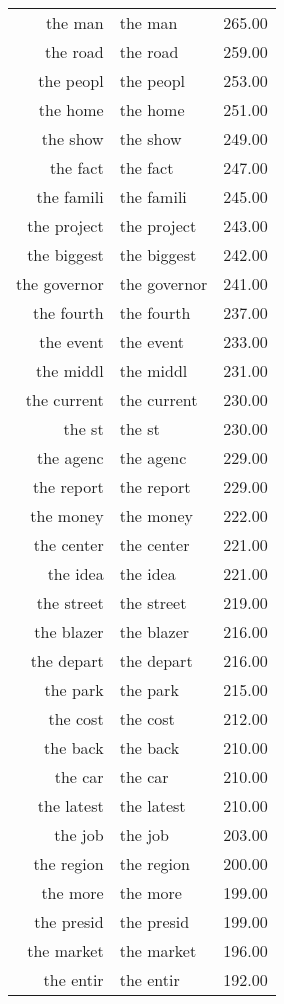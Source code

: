 \begin{table}[ht]
\begin{tabular}{rlr}
  the man & the man & 265.00 \\ 
  the road & the road & 259.00 \\ 
  the peopl & the peopl & 253.00 \\ 
  the home & the home & 251.00 \\ 
  the show & the show & 249.00 \\ 
  the fact & the fact & 247.00 \\ 
  the famili & the famili & 245.00 \\ 
  the project & the project & 243.00 \\ 
  the biggest & the biggest & 242.00 \\ 
  the governor & the governor & 241.00 \\ 
  the fourth & the fourth & 237.00 \\ 
  the event & the event & 233.00 \\ 
  the middl & the middl & 231.00 \\ 
  the current & the current & 230.00 \\ 
  the st & the st & 230.00 \\ 
  the agenc & the agenc & 229.00 \\ 
  the report & the report & 229.00 \\ 
  the money & the money & 222.00 \\ 
  the center & the center & 221.00 \\ 
  the idea & the idea & 221.00 \\ 
  the street & the street & 219.00 \\ 
  the blazer & the blazer & 216.00 \\ 
  the depart & the depart & 216.00 \\ 
  the park & the park & 215.00 \\ 
  the cost & the cost & 212.00 \\ 
  the back & the back & 210.00 \\ 
  the car & the car & 210.00 \\ 
  the latest & the latest & 210.00 \\ 
  the job & the job & 203.00 \\ 
  the region & the region & 200.00 \\ 
  the more & the more & 199.00 \\ 
  the presid & the presid & 199.00 \\ 
  the market & the market & 196.00 \\ 
  the entir & the entir & 192.00 \\ 

\end{tabular}
\end{table}
